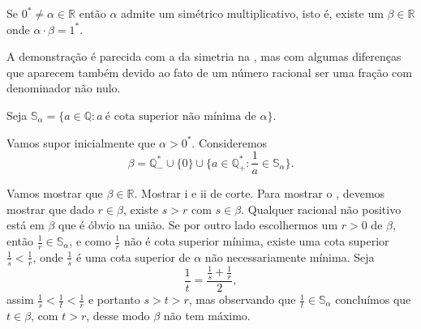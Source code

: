 \documentclass[../main.tex]{subfiles}
\begin{document}
\begin{teo}\label{reais-teo-simetricoProduto}
    Se $0^* \neq \alpha \in \mathbb{R}$ então $\alpha$ admite um simétrico multiplicativo, isto é, existe um $\beta \in \mathbb{R}$ onde $\alpha \cdot \beta = 1^*$.
\end{teo}
\begin{dem}
    A demonstração é parecida com a da simetria na , mas com algumas diferenças que aparecem também devido ao fato de um número racional ser uma fração com denominador não nulo.

    Seja $\mathbb{S}_{\alpha} = \{a \in \mathbb{Q} : a\ \text{é cota superior não mínima de }\alpha \}$.

    Vamos supor inicialmente que $\alpha > 0^*$. Consideremos 
    \[ \beta = \mathbb{Q}_{-}^* \cup \{ 0 \} \cup 
    \{ a \in \mathbb{Q}_{+}^* : \frac{1}{a} \in \mathbb{S}_{\alpha} \}. \] 

    Vamos mostrar que $\beta \in \mathbb{R}$.
    Mostrar i e ii de corte. 
    Para mostrar o , devemos mostrar que dado $r \in \beta$, existe $s>r$ com $s \in \beta$. Qualquer racional não positivo está em $\beta$ que é óbvio na união. Se por outro lado escolhermos um $r > 0$ de $\beta$, então $\frac{1}{r} \in \mathbb{S}_{\alpha}$, e como $\frac{1}{r}$ não é cota superior mínima, existe uma cota superior  $\frac{1}{s} < \frac{1}{r}$, onde $\frac{1}{s}$ é uma cota superior de $\alpha$ não necessariamente mínima. Seja 
    \[ \dfrac{1}{t} = \dfrac{\frac{1}{s} + \frac{1}{r}}{2}, \]
    assim $\frac{1}{s} < \frac{1}{t} < \frac{1}{r}$  e portanto $s > t > r$, mas observando que $\frac{1}{t} \in \mathbb{S}_{\alpha}$ concluímos que $t \in \beta$, com $t>r$, desse modo $\beta$ não tem máximo. 
\end{dem}
\end{document}
